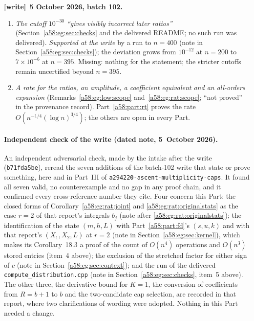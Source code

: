 \documentclass[11pt,letterpaper]{article}
\newcommand{\file}[1]{\nolinkurl{#1}}
\theoremstyle{remark}
\newenvironment{writenote}[1][]{\par\smallskip\begingroup\small
 \noindent\textbf{[write]}\if\relax\detokenize{#1}\relax\else~\textbf{#1.}\fi\ }%
 {\par\endgroup\smallskip}
\begin{document}
\begin{writenote}[5 October 2026, batch 102]
\begin{enumerate}
\item \emph{The cutoff $10^{-30}$ ``gives visibly incorrect later ratios''} (Section~\ref{a58:eg:sec:checks} and the delivered README; no such run was delivered). \emph{Supported at the write} by a run to $n=400$ (note in Section~\ref{a58:eg:sec:checks}); the deviation grows from $10^{-12}$ at $n=200$ to $7\times10^{-6}$ at $n=395$. Missing: nothing for the statement; the stricter cutoffs remain uncertified beyond $n=395$.
\item \emph{A rate for the ratios, an amplitude, a coefficient equivalent and an all-orders expansion} (Remarks~\ref{a58:eg:low:scope} and~\ref{a58:eg:rat:scope}; ``not proved'' in the provenance record). Part~\ref{a58:part:rt} proves the rate $O(n^{-1/4}(\log n)^{3/4})$; the others are open in every Part.
\end{enumerate}
\end{writenote}

\paragraph{Independent check of the write (dated note, 5~October 2026).}
An independent adversarial check, made by the intake after the write
(\texttt{b71fda5be}), reread the seven additions of the batch-102 write
that state or prove something, here and in Part~III of
\file{a294220-ascent-multiplicity-caps}. It found all seven valid, no
counterexample and no gap in any proof chain, and it confirmed every
cross-reference number they cite. Four concern this Part: the closed forms
of Corollary~\ref{a58:eg:rat:joint} and \eqref{a58:eg:rat:originalstats}
as the case $r=2$ of that report's integrals $b_j$ (note after
\eqref{a58:eg:rat:originalstats}); the identification of the state
$(m,h,L)$ with Part~\ref{a58:part:fd}'s $(s,u,k)$ and with that report's
$(X_1,X_2,L)$ at $r=2$ (note in Section~\ref{a58:eg:sec:kernel}), which
makes its Corollary~18.3 a proof of the count of $O(n^4)$ operations and
$O(n^3)$ stored entries (item~4 above); the exclusion of the stretched
factor for either sign of $c$ (note in Section~\ref{a58:eg:sec:context});
and the run of the delivered \file{compute_distribution.cpp} (note in
Section~\ref{a58:eg:sec:checks}, item~5 above). The other three, the
derivative bound for $K=1$, the conversion of coefficients from $R=b+1$
to $b$ and the two-candidate cap selection, are recorded in that report,
where two clarifications of wording were adopted. Nothing in this Part
needed a change.
\end{document}
